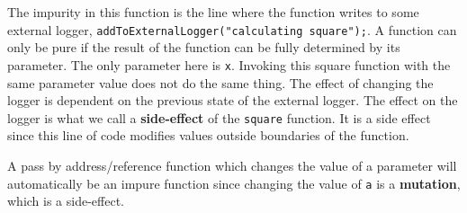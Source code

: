 \begin{Shaded}
\begin{Highlighting}[]
\OperatorTok{(}\OperatorTok{)\{}
\OperatorTok{(}\OperatorTok{);}
 \OperatorTok{*}\OperatorTok{;}
\OperatorTok{\}}
\end{Highlighting}
\end{Shaded}

The impurity in this function is the line where the function writes to
some external logger,
\texttt{addToExternalLogger("calculating\ square");}. A function can
only be pure if the result of the function can be fully determined by
its parameter. The only parameter here is \texttt{x}. Invoking this
square function with the same parameter value does not do the same
thing. The effect of changing the logger is dependent on the previous
state of the external logger. The effect on the logger is what we call a
\textbf{side-effect} of the \texttt{square} function. It is a side
effect since this line of code modifies values outside boundaries of the
function.

\begin{Shaded}
\begin{Highlighting}[]
\OperatorTok{*}\OperatorTok{(} \OperatorTok{*}\OperatorTok{,} \OperatorTok{)\{}
 \OperatorTok{(}\OperatorTok{=} \OperatorTok{;}\OperatorTok{\textless{}}\OperatorTok{;}\OperatorTok{++)}
\OperatorTok{[}\OperatorTok{]+}\OperatorTok{;}
\OperatorTok{\}}
\end{Highlighting}
\end{Shaded}

A pass by address/reference function which changes the value of a
parameter will automatically be an impure function since changing the
value of \texttt{a} is a \textbf{mutation}, which is a side-effect.

\begin{Shaded}
\begin{Highlighting}[]
 \OperatorTok{()\{}
    \OperatorTok{(}\OperatorTok{()\%}\OperatorTok{==}\OperatorTok{)}
         \OperatorTok{;}
         \OperatorTok{;}
\OperatorTok{\}}
\end{Highlighting}
\end{Shaded}

